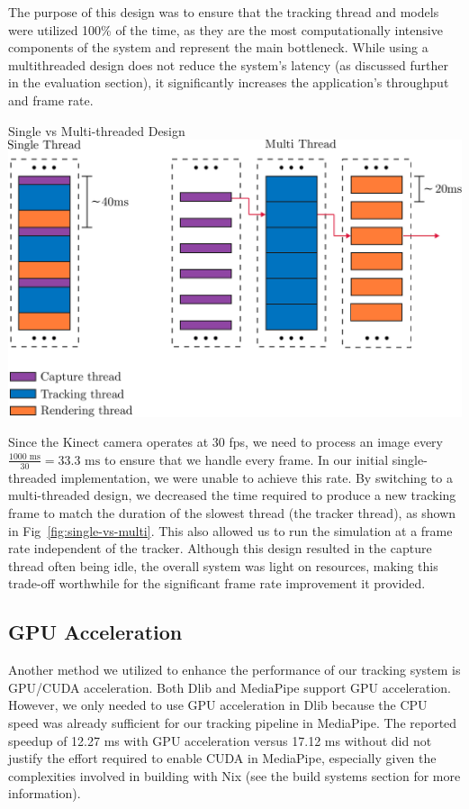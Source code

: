 The purpose of this design was to ensure that the tracking thread and models were utilized 100\% of the time, as they are the most computationally intensive components of the system and represent the main bottleneck. While using a multithreaded design does not reduce the system's latency (as discussed further in the evaluation section), it significantly increases the application's throughput and frame rate.

\begin{figureBox}[label={fig:single-vs-multi}, width=0.8\linewidth]{Single vs Multi-threaded Design}
    \includegraphics[width=0.8\linewidth]{./implementation/figures/single-vs-multi.pdf}
\end{figureBox}

Since the Kinect camera operates at 30 fps, we need to process an image every $ \frac{1000 \text{ ms}}{30} = 33.3 \text{ ms}$ to ensure that we handle every frame. In our initial single-threaded implementation, we were unable to achieve this rate. By switching to a multi-threaded design, we decreased the time required to produce a new tracking frame to match the duration of the slowest thread (the tracker thread), as shown in Fig~\ref{fig:single-vs-multi}. This also allowed us to run the simulation at a frame rate independent of the tracker. Although this design resulted in the capture thread often being idle, the overall system was light on resources, making this trade-off worthwhile for the significant frame rate improvement it provided.


\subsection{GPU Acceleration}

Another method we utilized to enhance the performance of our tracking system is GPU/CUDA acceleration. Both Dlib and MediaPipe support GPU acceleration. However, we only needed to use GPU acceleration in Dlib because the CPU speed was already sufficient for our tracking pipeline in MediaPipe. The reported speedup of 12.27 ms with GPU acceleration versus 17.12 ms without \cite{noauthor_hand_nodate} did not justify the effort required to enable CUDA in MediaPipe, especially given the complexities involved in building with Nix (see the build systems section for more information). \\

